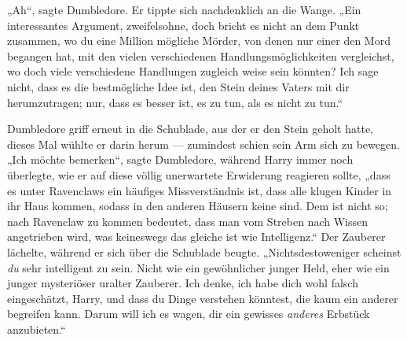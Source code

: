 „Ah“, sagte Dumbledore. Er tippte sich nachdenklich an die Wange.
„Ein interessantes Argument, zweifelsohne, doch bricht es nicht an dem Punkt zusammen, wo du eine Million mögliche Mörder, von denen nur einer den Mord begangen hat, mit den vielen verschiedenen Handlungsmöglichkeiten vergleichst, wo doch viele verschiedene Handlungen zugleich weise sein könnten? Ich sage nicht, dass es die bestmögliche Idee ist, den Stein deines Vaters mit dir herumzutragen; nur, dass es besser ist, es zu tun, als es nicht zu tun.“

Dumbledore griff erneut in die Schublade, aus der er den Stein geholt hatte, dieses Mal wühlte er darin herum — zumindest schien sein Arm sich zu bewegen.
„Ich möchte bemerken“, sagte Dumbledore, während Harry immer noch überlegte, wie er auf diese völlig unerwartete Erwiderung reagieren sollte, „dass es unter Ravenclaws ein häufiges Missverständnis ist, dass alle klugen Kinder in ihr Haus kommen, sodass in den anderen Häusern keine sind. Dem ist nicht so; nach Ravenclaw zu kommen bedeutet, dass man vom Streben nach Wissen angetrieben wird, was keineswegs das gleiche ist wie Intelligenz.“ Der Zauberer lächelte, während er sich über die Schublade beugte.
„Nichtsdestoweniger scheinst \emph{du} sehr intelligent zu sein. Nicht wie ein gewöhnlicher junger Held, eher wie ein junger mysteriöser uralter Zauberer. Ich denke, ich habe dich wohl falsch eingeschätzt, Harry, und dass du Dinge verstehen könntest, die kaum ein anderer begreifen kann. Darum will ich es wagen, dir ein gewisses \emph{anderes} Erbstück anzubieten.“

